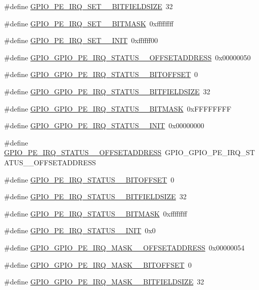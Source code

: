\begin{DoxyCompactItemize}
\#define \hyperlink{a00553_a143db6ce2d7512dccbf4758e0f7def9d}{GPIO\_\-PE\_\-IRQ\_\-SET\_\_\-BITFIELDSIZE}~32
\item 
\#define \hyperlink{a00553_ad3ac59b4df23b8f1d42aaeb41cd82ef2}{GPIO\_\-PE\_\-IRQ\_\-SET\_\_\-BITMASK}~0xffffffff
\item 
\#define \hyperlink{a00553_a416057891f53f43db6936aa7fb491619}{GPIO\_\-PE\_\-IRQ\_\-SET\_\_\-INIT}~0xffffff00
\item 
\#define \hyperlink{a00553_a9ff6a0eff6b8e6203a9a2f8bd7da6ac0}{GPIO\_\-GPIO\_\-PE\_\-IRQ\_\-STATUS\_\_\-OFFSETADDRESS}~0x00000050
\item 
\#define \hyperlink{a00553_a3391b45acbb724d0d2c5c1f1a45a5561}{GPIO\_\-GPIO\_\-PE\_\-IRQ\_\-STATUS\_\_\-BITOFFSET}~0
\item 
\#define \hyperlink{a00553_a81181cc80c7b740d27eede83c8c9fc1c}{GPIO\_\-GPIO\_\-PE\_\-IRQ\_\-STATUS\_\_\-BITFIELDSIZE}~32
\item 
\#define \hyperlink{a00553_a2ec216b68ee1434c9bda813aff1aa21c}{GPIO\_\-GPIO\_\-PE\_\-IRQ\_\-STATUS\_\_\-BITMASK}~0xFFFFFFFF
\item 
\#define \hyperlink{a00553_ae66761a30aba9dd69c19c5e19d08f1d9}{GPIO\_\-GPIO\_\-PE\_\-IRQ\_\-STATUS\_\_\-INIT}~0x00000000
\item 
\#define \hyperlink{a00553_aaed2d517a76c6fc383465e824207dfa5}{GPIO\_\-PE\_\-IRQ\_\-STATUS\_\_\-OFFSETADDRESS}~GPIO\_\-GPIO\_\-PE\_\-IRQ\_\-STATUS\_\_\-OFFSETADDRESS
\item 
\#define \hyperlink{a00553_a293f291b2a382333575318983a19d42c}{GPIO\_\-PE\_\-IRQ\_\-STATUS\_\_\-BITOFFSET}~0
\item 
\#define \hyperlink{a00553_a9bac46b44889c0492a1046951eb8b4a1}{GPIO\_\-PE\_\-IRQ\_\-STATUS\_\_\-BITFIELDSIZE}~32
\item 
\#define \hyperlink{a00553_ade3ee9807f4d54b11d505979fe3ca0fc}{GPIO\_\-PE\_\-IRQ\_\-STATUS\_\_\-BITMASK}~0xffffffff
\item 
\#define \hyperlink{a00553_afb1716b5d0f39e27a9058d9fcb57f29d}{GPIO\_\-PE\_\-IRQ\_\-STATUS\_\_\-INIT}~0x0
\item 
\#define \hyperlink{a00553_adc794ddf159da3dff7b76b8555d8783f}{GPIO\_\-GPIO\_\-PE\_\-IRQ\_\-MASK\_\_\-OFFSETADDRESS}~0x00000054
\item 
\#define \hyperlink{a00553_a04b090c638bd1fccd9e9a9bb1675fe6a}{GPIO\_\-GPIO\_\-PE\_\-IRQ\_\-MASK\_\_\-BITOFFSET}~0
\item 
\#define \hyperlink{a00553_a3256bcd498e216e597d6ac2c4f499e3a}{GPIO\_\-GPIO\_\-PE\_\-IRQ\_\-MASK\_\_\-BITFIELDSIZE}~32

\end{DoxyCompactItemize}
